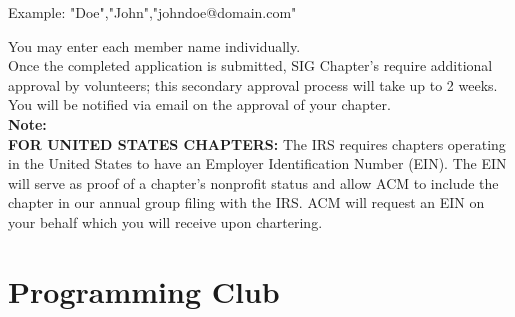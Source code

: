 \begin{flushright}
Example: "Doe","John","johndoe@domain.com" 
\end{flushright}

You may enter each member name individually.
\\
Once the completed application is submitted, SIG Chapter's require additional approval by volunteers; this secondary approval process will take up to 2 weeks. You will be notified via email on the approval of your chapter.
\\
\textbf{Note:}
\\
\textbf{FOR UNITED STATES CHAPTERS:}  The IRS requires chapters operating in the United States to have an Employer Identification Number (EIN). The EIN will serve as proof of a chapter's nonprofit status and allow ACM to include the chapter in our annual group filing with the IRS. ACM will request an EIN on your behalf which you will receive upon chartering. 

\section{Programming Club}

